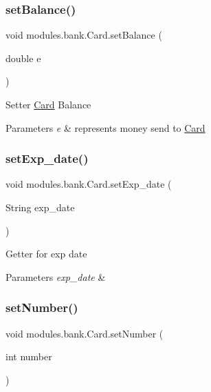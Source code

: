 \subsubsection{\texorpdfstring{set\+Balance()}{setBalance()}}
{\footnotesize\ttfamily void modules.\+bank.\+Card.\+set\+Balance (\begin{DoxyParamCaption}\item[{double}]{e }\end{DoxyParamCaption})\hspace{0.3cm}{\ttfamily [inline]}}

Setter \mbox{\hyperlink{classmodules_1_1bank_1_1_card}{Card}} Balance 
\begin{DoxyParams}{Parameters}
{\em e} & represents money send to \mbox{\hyperlink{classmodules_1_1bank_1_1_card}{Card}} \\
\hline
\end{DoxyParams}
\mbox{\label{classmodules_1_1bank_1_1_card_aa51b9d8df455d47e167192a911ca883b}} 
\subsubsection{\texorpdfstring{set\+Exp\+\_\+date()}{setExp\_date()}}
{\footnotesize\ttfamily void modules.\+bank.\+Card.\+set\+Exp\+\_\+date (\begin{DoxyParamCaption}\item[{String}]{exp\+\_\+date }\end{DoxyParamCaption})\hspace{0.3cm}{\ttfamily [inline]}}

Getter for exp date 
\begin{DoxyParams}{Parameters}
{\em exp\+\_\+date} & \\
\hline
\end{DoxyParams}
\mbox{\label{classmodules_1_1bank_1_1_card_a86370f2515d7612de7da603be14bad44}} 
\subsubsection{\texorpdfstring{set\+Number()}{setNumber()}}
{\footnotesize\ttfamily void modules.\+bank.\+Card.\+set\+Number (\begin{DoxyParamCaption}\item[{int}]{number }\end{DoxyParamCaption})\hspace{0.3cm}{\ttfamily [inline]}}

